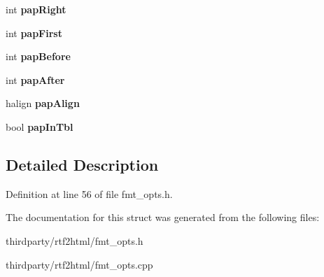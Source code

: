 \begin{DoxyCompactItemize}
\mbox{\label{structformatting__options_a33e8c053881fc1be427bfd2ac655b50b}} 
int {\bfseries pap\+Right}
\item 
\mbox{\label{structformatting__options_ac6fd43706ba05297d3a734be42af5f1d}} 
int {\bfseries pap\+First}
\item 
\mbox{\label{structformatting__options_a8d0ff7ceb75ba3ef3e5aa6e9431d3329}} 
int {\bfseries pap\+Before}
\item 
\mbox{\label{structformatting__options_a6e32bf9428e65320d71b247c10c010a4}} 
int {\bfseries pap\+After}
\item 
\mbox{\label{structformatting__options_a7d9a02e3148bec8d2a1b0d40f70e51a4}} 
halign {\bfseries pap\+Align}
\item 
\mbox{\label{structformatting__options_a9c4e3a91c9a37a8d506108e8baede527}} 
bool {\bfseries pap\+In\+Tbl}
\end{DoxyCompactItemize}


\subsection{Detailed Description}


Definition at line 56 of file fmt\+\_\+opts.\+h.



The documentation for this struct was generated from the following files\+:\begin{DoxyCompactItemize}
\item 
thirdparty/rtf2html/fmt\+\_\+opts.\+h\item 
thirdparty/rtf2html/fmt\+\_\+opts.\+cpp\end{DoxyCompactItemize}
